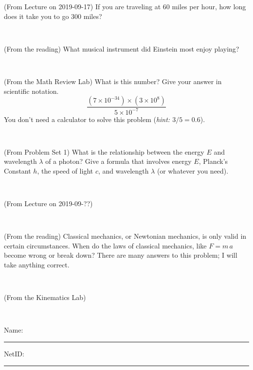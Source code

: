 \documentclass[12pt, letterpaper]{article}
\begin{document}
\begin{problem} (From Lecture on 2019-09-17)
If you are traveling at 60 miles per hour, how long does
it take you to go 300 miles?
\end{problem}


\vfill ~

\begin{problem} (From the reading)
What musical instrument did Einstein most enjoy playing?
\end{problem}


\vfill ~

\begin{problem} (From the Math Review Lab)
What is this number? Give your answer in scientific notation.
$$
\frac{(7\times10^{-34})\times(3\times10^8)}{5\times10^{-7}}
$$
You don't need a calculator to solve this problem (\textit{hint: $3/5=0.6$}).
\end{problem}


\vfill ~


\clearpage


\begin{problem} (From Problem Set 1)
What is the relationship between the energy $E$ and wavelength
$\lambda$ of a photon? Give a formula that involves energy $E$,
Planck's Constant $h$, the speed of light $c$, and wavelength
$\lambda$ (or whatever you need).
\end{problem}

\vfill ~

\begin{problem} (From Lecture on 2019-09-??)
\end{problem}


\vfill ~

\begin{problem} (From the reading)
Classical mechanics, or Newtonian mechanics, is only valid in certain
circumstances. When do the laws of classical mechanics, like $F =
m\,a$ become wrong or break down? There are many answers to this
problem; I will take anything correct.
\end{problem}


\vfill ~

\begin{problem} (From the Kinematics Lab)

\end{problem}


\vfill ~


\cleardoublepage



\noindent
Name: \rule[-1ex]{0.60\textwidth}{0.1pt}
NetID: \rule[-1ex]{0.20\textwidth}{0.1pt}
\end{document}
